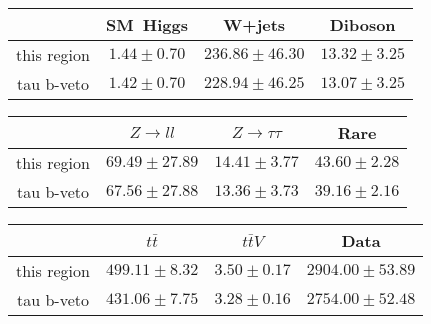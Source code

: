 \centering
\begin{tabular}{|c|c|c|c|} \hline
 & SM~Higgs & W+jets & Diboson\\\hline
this region & $1.44\pm0.70$ & $236.86\pm46.30$ & $13.32\pm3.25$\\\hline
tau b-veto & $1.42\pm0.70$ & $228.94\pm46.25$ & $13.07\pm3.25$\\\hline
\end{tabular}
\begin{tabular}{|c|c|c|c|} \hline
 & $Z\to ll$ & $Z\to \tau\tau$ & Rare\\\hline
this region & $69.49\pm27.89$ & $14.41\pm3.77$ & $43.60\pm2.28$\\\hline
tau b-veto & $67.56\pm27.88$ & $13.36\pm3.73$ & $39.16\pm2.16$\\\hline
\end{tabular}
\begin{tabular}{|c|c|c|c|} \hline
 & $t\bar{t}$ & $t\bar{t}V$ & Data\\\hline
this region & $499.11\pm8.32$ & $3.50\pm0.17$ & $2904.00\pm53.89$\\\hline
tau b-veto & $431.06\pm7.75$ & $3.28\pm0.16$ & $2754.00\pm52.48$\\\hline
\end{tabular}
